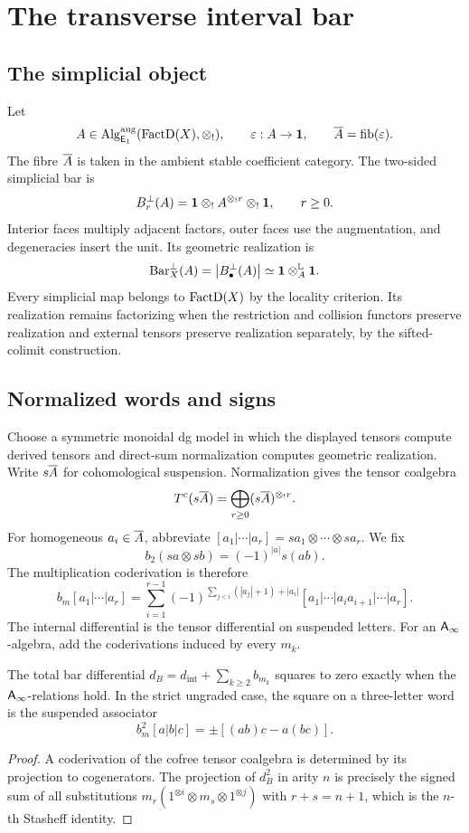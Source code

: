 \chapter{The transverse interval bar}\label{chap:transverse-bar}

\section{The simplicial object}
Let
\[
 A\in\operatorname{Alg}^{\mathrm{aug}}_{\mathsf E_1}(\operatorname{FactD}(X),\mathbin{\otimes_{!}}),
 \qquad \varepsilon:A\to\mathbf 1,
 \qquad \overline{A}=\operatorname{fib}(\varepsilon).
\]
The fibre $\overline{A}$ is taken in the ambient stable coefficient category.
The two-sided simplicial bar is
\[
 B_r^{\perp}(A)=\mathbf 1\mathbin{\otimes_{!}} A^{\mathbin{\otimes_{!}} r}\mathbin{\otimes_{!}}\mathbf 1,
 \qquad r\ge0.
\]
Interior faces multiply adjacent factors, outer faces use the augmentation, and degeneracies insert the unit.  Its geometric realization is
\[
 \operatorname{Bar}_X^{\perp}(A)=\bigl|B_\bullet^{\perp}(A)\bigr|
 \simeq \mathbf 1\otimes_A^{\mathbb L}\mathbf 1.
\]
Every simplicial map belongs to \(\operatorname{FactD}(X)\) by the locality criterion.
Its realization remains factorizing when the restriction and collision functors preserve realization
and external tensors preserve realization separately, by the sifted-colimit construction.

\section{Normalized words and signs}
Choose a symmetric monoidal dg model in which the displayed tensors compute derived tensors
and direct-sum normalization computes geometric realization.
Write \(s\overline{A}\) for cohomological suspension.  Normalization gives the tensor coalgebra
\[
 T^c(s\overline{A})=\bigoplus_{r\ge0}(s\overline{A})^{\mathbin{\otimes_{!}} r}.
\]
For homogeneous \(a_i\in\overline{A}\), abbreviate
\(
 [a_1|\cdots|a_r]=sa_1\otimes\cdots\otimes sa_r.
\)
We fix
\[
 b_2(sa\otimes sb)=(-1)^{|a|}s(ab).
\]
The multiplication coderivation is therefore
\[
 b_m[a_1|\cdots|a_r]
 =\sum_{i=1}^{r-1}
 (-1)^{\sum_{j<i}(|a_j|+1)+|a_i|}
 [a_1|\cdots|a_ia_{i+1}|\cdots|a_r].
\]
The internal differential is the tensor differential on suspended letters.  For an \(\mathsf A_\infty\)-algebra, add the coderivations induced by every \(m_k\).

\begin{proposition}
The total bar differential \(d_B=d_{\mathrm{int}}+\sum_{k\ge2}b_{m_k}\) squares to zero exactly when the \(\mathsf A_\infty\)-relations hold.  In the strict ungraded case, the square on a three-letter word is the suspended associator
\[
 b_m^2[a|b|c]=\pm[(ab)c-a(bc)].
\]
\end{proposition}
\begin{proof}
A coderivation of the cofree tensor coalgebra is determined by its projection to cogenerators.  The projection of \(d_B^2\) in arity \(n\) is precisely the signed sum of all substitutions \(m_r(1^{\otimes i}\otimes m_s\otimes1^{\otimes j})\) with \(r+s=n+1\), which is the \(n\)-th Stasheff identity.
\end{proof}

